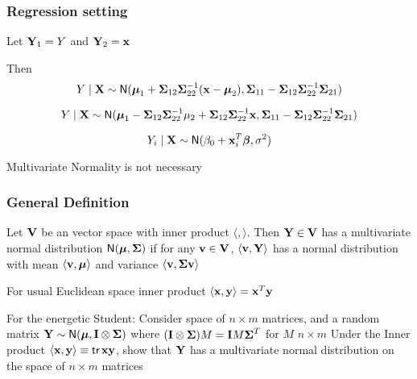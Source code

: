 \documentclass[handout]{beamer}
\begin{document}
\begin{frame}
  \frametitle{Regression setting}
  Let $\mathbf{Y}_1 = Y$ and  $\mathbf{Y}_2 = \mathbf{x}$

Then
$$
Y \mid \mathbf{X} \sim \textsf{N}( \boldsymbol{\mu}_1 + \boldsymbol{\Sigma}_{12} \boldsymbol{\Sigma}_{22}^{-1}( \mathbf{x} -
      \boldsymbol{\mu}_2),  \boldsymbol{\Sigma}_{11} - \boldsymbol{\Sigma}_{12} \boldsymbol{\Sigma}_{22}^{-1}
      \boldsymbol{\Sigma}_{21})
$$

$$
Y \mid \mathbf{X} \sim \textsf{N}( \boldsymbol{\mu}_1 - \boldsymbol{\Sigma}_{12} \boldsymbol{\Sigma}_{22}^{-1} \mu_2  + \boldsymbol{\Sigma}_{12} \boldsymbol{\Sigma}_{22}^{-1} \mathbf{x} ,  \boldsymbol{\Sigma}_{11} - \boldsymbol{\Sigma}_{12} \boldsymbol{\Sigma}_{22}^{-1}
      \boldsymbol{\Sigma}_{21})
$$

$$
Y_i \mid \mathbf{X} \sim \textsf{N}( \beta_0  + \mathbf{x}_i^T \boldsymbol{\beta} ,  \sigma^2)
$$

Multivariate Normality is not necessary
\end{frame}

\begin{frame}
  \frametitle{General Definition }
  \begin{definition}
  Let $\mathbf{V}$ be an vector  space with inner product $\langle ,
  \rangle$.  Then
  $\mathbf{Y} \in \mathbf{V}$ has a  multivariate normal distribution $\textsf{N}(\boldsymbol{\mu},
  \boldsymbol{\Sigma})$ if for any $\mathbf{v} \in \mathbf{V}$, $\langle \mathbf{v}, \mathbf{Y} \rangle$ has a normal
  distribution with mean $\langle \mathbf{v},\boldsymbol{\mu} \rangle $ and variance
  $\langle \mathbf{v},  \boldsymbol{\Sigma} \mathbf{v} \rangle$
  \end{definition} \pause

For usual Euclidean space inner product $\langle \mathbf{x}, \mathbf{y} \rangle =
\mathbf{x}^T\mathbf{y}$ \pause

\vfill
For the energetic Student:  Consider space of $n \times m$ matrices,
and a random matrix $\mathbf{Y} \sim \textsf{N}(\boldsymbol{\mu}, \mathbf{I} \otimes \boldsymbol{\Sigma})$
where  $(\mathbf{I} \otimes \boldsymbol{\Sigma}) M = \mathbf{I} M \boldsymbol{\Sigma}^T$ for $M$ $n \times m$
\pause
\vfill
Under the Inner product $\langle \mathbf{x}, \mathbf{y} \rangle \equiv \textsf{tr} \, \mathbf{x} \mathbf{y}$, show that $
\mathbf{Y}$ has a multivariate normal distribution on the space of $n \times
m$  matrices
\end{frame}
\end{document}
